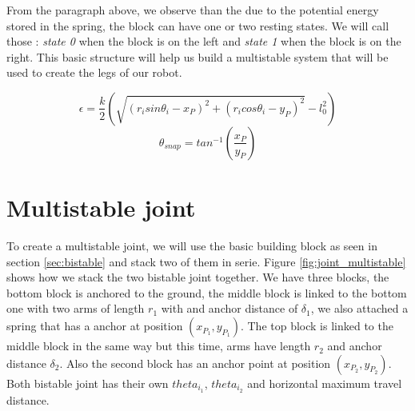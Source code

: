    From the paragraph above, we observe than the due to the potential energy stored in the spring, the block can have one or two resting states. We will call those : \textit{state 0} when the block is on the left and \textit{state 1} when the block is on the right. This basic structure will help us build a multistable system that will be used to create the legs of our robot.
    

    \begin{equation}
        \epsilon = \frac{k}{2}\left(\sqrt{(r_i sin\theta_i - x_P)^2 + (r_i cos\theta_i - y_P)^2} - l_0^2\right)    
        \label{eq:potential_single}
    \end{equation}
    \begin{equation}
        \theta_{snap} = tan^{-1}\left(\frac{x_P}{y_P}\right)    
        \label{eq:snap_angle}
    \end{equation}
    
    
    
    \section{Multistable joint}
        To create a multistable joint, we will use the basic building block as seen in section \ref{sec:bistable} and stack two of them in serie. Figure \ref{fig:joint_multistable} shows how we stack the two bistable joint together. We have three blocks, the bottom block is anchored to the ground, the middle block is linked to the bottom one with two arms of length $r_1$ with and anchor distance of $\delta_1$, we also attached a spring that has a anchor at position $(x_{P_1}, y_{P_1})$. The top block is linked to the middle block in the same way but this time, arms have length $r_2$ and anchor distance $\delta_2$. Also the second block has an anchor point at position $(x_{P_2}, y_{P_2})$. 
        Both bistable joint has their own $theta_{i_1}$, $theta_{i_2}$ and horizontal maximum travel distance.
        
